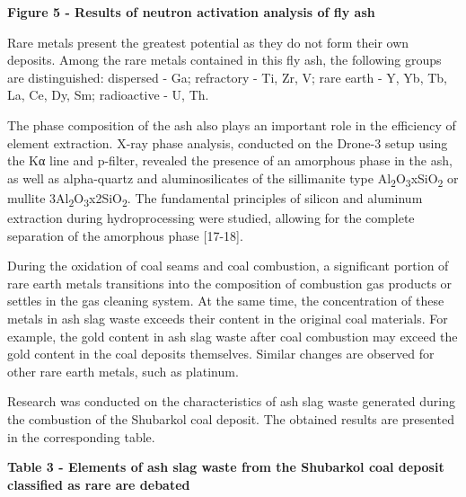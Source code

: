 {\bfseries Figure 5 - Results of neutron activation analysis of fly ash}

Rare metals present the greatest potential as they do not form their own
deposits. Among the rare metals contained in this fly ash, the following
groups are distinguished: dispersed - Ga; refractory - Ti, Zr, V; rare
earth - Y, Yb, Tb, La, Ce, Dy, Sm; radioactive - U, Th.

The phase composition of the ash also plays an important role in the
efficiency of element extraction. X-ray phase analysis, conducted on the
Drone-3 setup using the Kα line and p-filter, revealed the presence of
an amorphous phase in the ash, as well as alpha-quartz and
aluminosilicates of the sillimanite type
Al\textsubscript{2}O\textsubscript{3}xSiO\textsubscript{2} or mullite
3Al\textsubscript{2}O\textsubscript{3}x2SiO\textsubscript{2}. The
fundamental principles of silicon and aluminum extraction during
hydroprocessing were studied, allowing for the complete separation of
the amorphous phase {[}17-18{]}.

During the oxidation of coal seams and coal combustion, a significant
portion of rare earth metals transitions into the composition of
combustion gas products or settles in the gas cleaning system. At the
same time, the concentration of these metals in ash slag waste exceeds
their content in the original coal materials. For example, the gold
content in ash slag waste after coal combustion may exceed the gold
content in the coal deposits themselves. Similar changes are observed
for other rare earth metals, such as platinum.

Research was conducted on the characteristics of ash slag waste
generated during the combustion of the Shubarkol coal deposit. The
obtained results are presented in the corresponding table.

{\bfseries Table 3 - Elements of ash slag waste from the Shubarkol coal
deposit classified as rare are debated}

